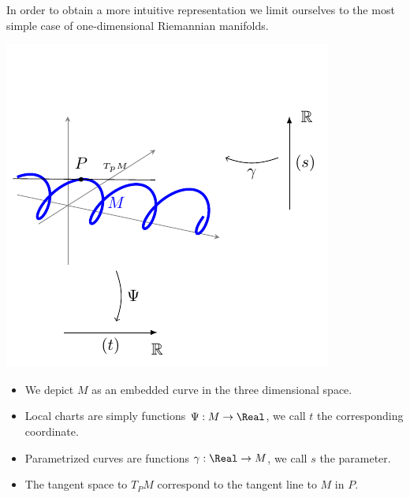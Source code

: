 \documentclass[Main]{subfiles}
\begin{document}
		\vspace{2mm}
		In order to obtain a more intuitive representation we limit ourselves to the most simple case of one-dimensional Riemannian manifolds.

		\vspace{1mm}		
		\begin{minipage}{0.5\textwidth}
			\includegraphics[width=\textwidth]{Pictures/Jacobi1D_GeometricPicture0}
		\end{minipage}
		\begin{minipage}{0.5\textwidth}
			\begin{itemize}
				\item We depict $M$ as an embedded curve in the three dimensional space.
				\item Local charts are simply functions $\Psi: M \rightarrow \Real$, we call $t$ the corresponding coordinate.
				\item Parametrized curves are functions $\gamma: \Real \rightarrow M$, we call $s$ the parameter.
				\item The tangent space to $T_P M$ correspond to the tangent line to $M$ in $P$.
			\end{itemize}
		\end{minipage}
		\vspace{1mm}\\	
		
\end{document}
